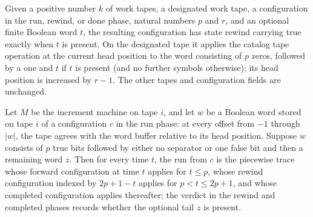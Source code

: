 \begin{definition}
\label{Turing.catalogIncR}
\leanok
{}
Given a positive number $k$ of work tapes, a designated work tape, a configuration in
the run, rewind, or done phase, natural numbers $p$ and $r$, and an optional finite
Boolean word $t$, the resulting configuration has state rewind carrying true exactly
when $t$ is present. On the designated tape it applies the catalog tape operation at the
current head position to the word consisting of $p$ zeros, followed by a one and $t$ if
$t$ is present (and no further symbols otherwise); its head position is increased by
$r-1$. The other tapes and configuration fields are unchanged.
\end{definition}

\begin{lemma}
\label{Turing.catalog_increment_trace}
\leanok
{}
Let $M$ be the increment machine on tape $i$, and let $w$ be a Boolean word stored on
tape $i$ of a configuration $c$ in the run phase: at every offset from $-1$ through
$|w|$, the tape agrees with the word buffer relative to its head position. Suppose $w$
consists of $p$ true bits followed by either no separator or one false bit and then a
remaining word $z$. Then for every time $t$, the run from $c$ is the piecewise trace
whose forward configuration at time $t$ applies for $t\le p$, whose rewind configuration
indexed by $2p+1-t$ applies for $p<t\le2p+1$, and whose completed configuration applies
thereafter; the verdict in the rewind and completed phases records whether the optional
tail $z$ is present.
\end{lemma}

